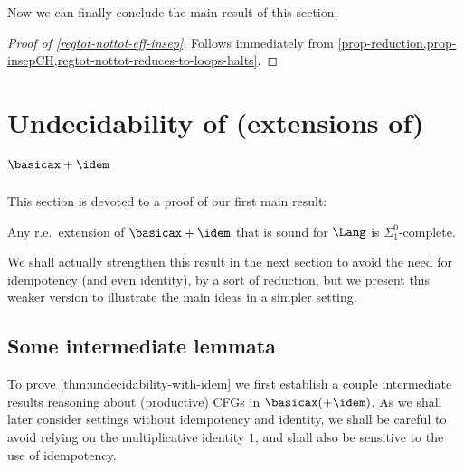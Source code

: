 Now we can finally conclude the main result of this section:
\begin{proof}
    [Proof of \cref{regtot-nottot-eff-insep}]
    Follows immediately from \cref{prop-reduction,prop-insepCH,regtot-nottot-reduces-to-loops-halts}.
\end{proof}




\section{Undecidability of (extensions of) $\basicax + \idem$ }
\label{sec:undec-with-idem}

This section is devoted to a proof of our first main result:

\begin{theorem}
\label{thm:undecidability-with-idem}
    Any r.e.\ extension of $\basicax + \idem$ that is sound for $\Lang$ is $\Sigma^0_1$-complete.
\end{theorem}

We shall actually strengthen this result in the next section to avoid the need for idempotency (and even identity), by a sort of reduction, but we present this weaker version to illustrate the main ideas in a simpler setting.


\subsection{Some intermediate lemmata}

To prove \cref{thm:undecidability-with-idem} we first establish a couple intermediate results reasoning about (productive) CFGs in $\basicax (+ \idem)$.
As we shall later consider settings without idempotency and identity, we shall be careful to avoid relying on the multiplicative identity $1$, and shall also be sensitive to the use of idempotency.


